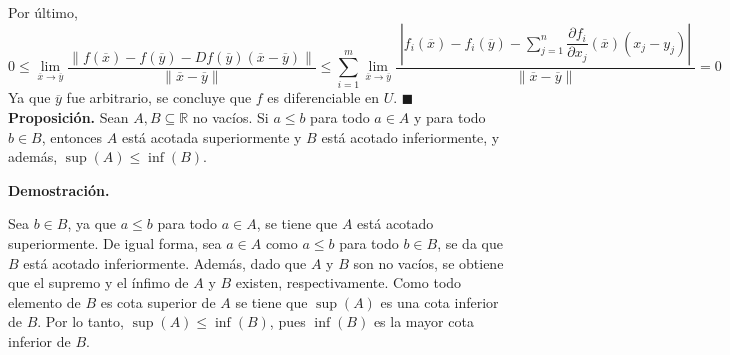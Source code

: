\documentclass[fleqn]{article}
\begin{document}
	Por último, 
	\begin{equation*}
		0 \leq \lim_{\overline{x} \to \overline{y}} \dfrac{ \left\lVert f(\overline{x}) - f(\overline{y}) - Df(\overline{y}) \left( \overline{x} - \overline{y} \right) \right\rVert }{ \left\lVert \overline{x} - \overline{y} \right\rVert } \leq \sum_{i=1}^{m} \lim_{\overline{x} \to \overline{y}} \dfrac{ \phantom{|} \left\lvert f_i(\overline{x}) - f_i(\overline{y}) - \displaystyle \sum_{j=1}^{n} \dfrac{\partial f_i}{\partial x_j} (\overline{x}) \left( x_j - y_j \right) \right\rvert \phantom{|}}{ \left\lVert \overline{x} - \overline{y} \right\rVert } = 0
	\end{equation*}
	Ya que $ \overline{y} $ fue arbitrario, se concluye que $ f $ es diferenciable en $ U $. \hfill $ \blacksquare $ \\


	\textbf{Proposición.} Sean $ A, B \subseteq \mathbb{R} $ no vacíos. Si $ a \leq b $ para todo $ a \in A $ y para todo $ b \in B $, entonces $ A $ está acotada superiormente y $ B $ está acotado inferiormente, y además, $ \sup (A) \leq \inf (B) $.

	\textbf{Demostración.} 

	Sea $ b \in B $, ya que $ a \leq b $ para todo $ a \in A $, se tiene que $ A $ está acotado superiormente. De igual forma, sea $ a \in A $ como $ a \leq b $ para todo $ b \in B $, se da que $ B $ está acotado inferiormente. Además, dado que $ A $ y $ B $ son no vacíos, se obtiene que el supremo y el ínfimo de $ A $ y $ B $ existen, respectivamente. Como todo elemento de $ B $ es cota superior de $ A $ se tiene que $ \sup (A) $ es una cota inferior de $ B $. Por lo tanto, $ \sup (A) \leq \inf (B) $, pues $ \inf(B) $ es la mayor cota inferior de $ B $.
\end{document}
